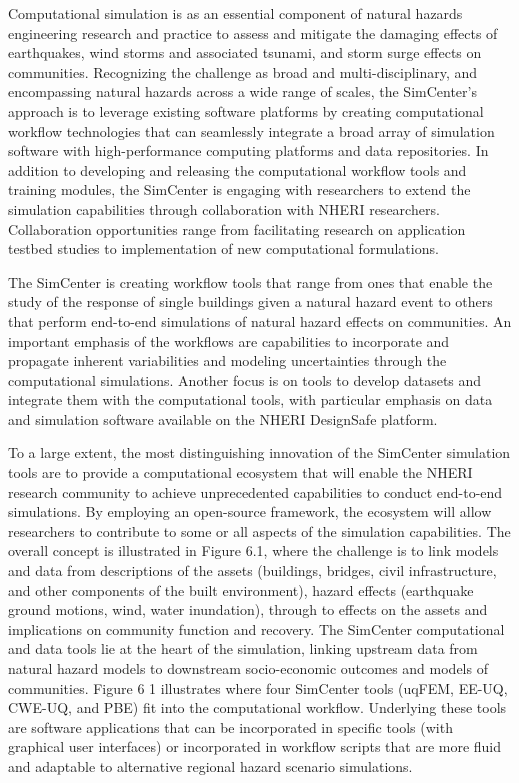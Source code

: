 Computational simulation is as an essential component of natural hazards engineering research and practice to assess and mitigate the damaging effects of earthquakes, wind storms and associated tsunami, and storm surge effects on communities. Recognizing the challenge as broad and multi-disciplinary, and encompassing natural hazards across a wide range of scales, the SimCenter’s approach is to leverage existing software platforms by creating computational workflow technologies that can seamlessly integrate a broad array of simulation software with high-performance computing platforms and data repositories. In addition to developing and releasing the computational workflow tools and training modules, the SimCenter is engaging with researchers to extend the simulation capabilities through collaboration with NHERI researchers. Collaboration opportunities range from facilitating research on application testbed studies to implementation of new computational formulations.

The SimCenter is creating workflow tools that range from ones that enable the study of the response of single buildings given a natural hazard event to others that perform end-to-end simulations of natural hazard effects on communities. An important emphasis of the workflows are capabilities to incorporate and propagate inherent variabilities and modeling uncertainties through the computational simulations. Another focus is on tools to develop datasets and integrate them with the computational tools, with particular emphasis on data and simulation software available on the NHERI DesignSafe platform.

To a large extent, the most distinguishing innovation of the SimCenter simulation tools are to provide a computational ecosystem that will enable the NHERI research community to achieve unprecedented capabilities to conduct end-to-end simulations. By employing an open-source framework, the ecosystem will allow researchers to contribute to some or all aspects of the simulation capabilities. The overall concept is illustrated in Figure 6.1, where the challenge is to link models and data from descriptions of the assets (buildings, bridges, civil infrastructure, and other components of the built environment), hazard effects (earthquake ground motions, wind, water inundation), through to effects on the assets and implications on community function and recovery. The SimCenter computational and data tools lie at the heart of the simulation, linking upstream data from natural hazard models to downstream socio-economic outcomes and models of communities. Figure 6 1 illustrates where four SimCenter tools (uqFEM, EE-UQ, CWE-UQ, and PBE) fit into the computational workflow. Underlying these tools are software applications that can be incorporated in specific tools (with graphical user interfaces) or incorporated in workflow scripts that are more fluid and adaptable to alternative regional hazard scenario simulations. 

